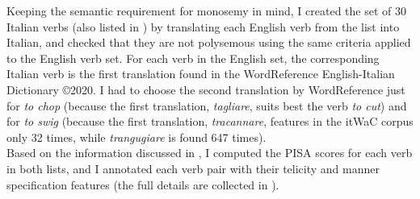 Keeping the semantic requirement for monosemy in mind, I created the set of 30 Italian verbs (also listed in ) by translating each English verb from the list into Italian, and checked that they are not polysemous using the same criteria applied to the English verb set. For each verb in the English set, the corresponding Italian verb is the first translation found in the WordReference English-Italian Dictionary \copyright 2020. I had to choose the second translation by WordReference just for \textit{to chop} (because the first translation, \textit{tagliare}, suits best the verb \textit{to cut}) and for \textit{to swig} (because the first translation, \textit{tracannare}, features in the itWaC corpus only 32 times, while \textit{trangugiare} is found 647 times).\\
Based on the information discussed in , I computed the PISA scores for each verb in both lists, and I annotated each verb pair with their telicity and manner specification features (the full details are collected in ).\\

